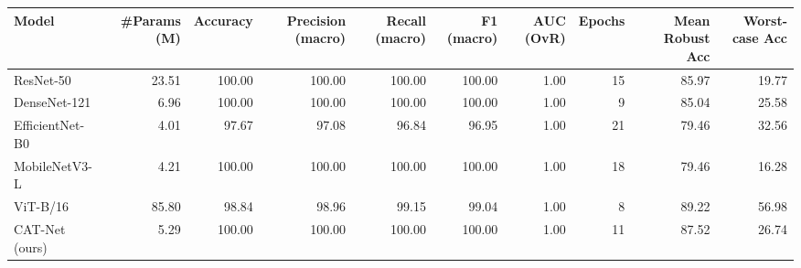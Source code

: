 \begin{tabular}{lrrrrrrrrr}
\toprule
Model & #Params (M) & Accuracy & Precision (macro) & Recall (macro) & F1 (macro) & AUC (OvR) & Epochs & Mean Robust Acc & Worst-case Acc \\
\midrule
ResNet-50 & 23.51 & 100.00 & 100.00 & 100.00 & 100.00 & 1.00 & 15 & 85.97 & 19.77 \\
DenseNet-121 & 6.96 & 100.00 & 100.00 & 100.00 & 100.00 & 1.00 & 9 & 85.04 & 25.58 \\
EfficientNet-B0 & 4.01 & 97.67 & 97.08 & 96.84 & 96.95 & 1.00 & 21 & 79.46 & 32.56 \\
MobileNetV3-L & 4.21 & 100.00 & 100.00 & 100.00 & 100.00 & 1.00 & 18 & 79.46 & 16.28 \\
ViT-B/16 & 85.80 & 98.84 & 98.96 & 99.15 & 99.04 & 1.00 & 8 & 89.22 & 56.98 \\
CAT-Net (ours) & 5.29 & 100.00 & 100.00 & 100.00 & 100.00 & 1.00 & 11 & 87.52 & 26.74 \\
\bottomrule
\end{tabular}
